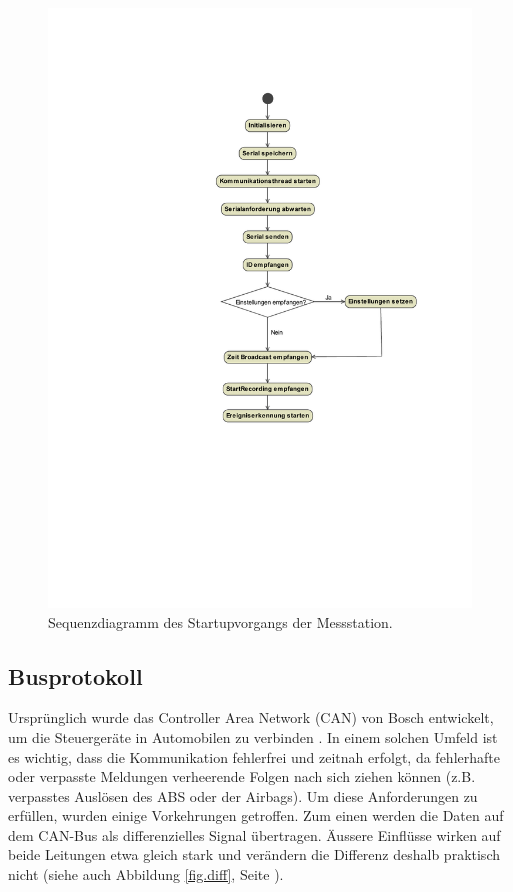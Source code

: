 \begin{figure}
	\centering
		\includegraphics[height=0.9\textheight]{images/magicdraw/AblaufSensor.pdf}
	\caption{Sequenzdiagramm des Startupvorgangs der Messstation.}
	\label{fig.seqstartupsensor}
\end{figure}


\subsection{Busprotokoll}\label{subsec.sw_busprotokoll}
Ursprünglich wurde das Controller Area Network (CAN) von Bosch entwickelt, um die Steuergeräte in Automobilen zu verbinden \cite{boschcanspec2}. In einem solchen Umfeld ist es wichtig, dass die Kommunikation fehlerfrei und zeitnah erfolgt, da fehlerhafte oder verpasste Meldungen verheerende Folgen nach sich ziehen können (z.B. verpasstes Auslösen des ABS oder der Airbags). Um diese Anforderungen zu erfüllen, wurden einige Vorkehrungen getroffen. Zum einen werden die Daten auf dem CAN-Bus als differenzielles Signal übertragen. Äussere Einflüsse wirken auf beide Leitungen etwa gleich stark und verändern die Differenz deshalb praktisch nicht (siehe auch Abbildung \ref{fig.diff}, Seite \pageref{fig.diff}).


